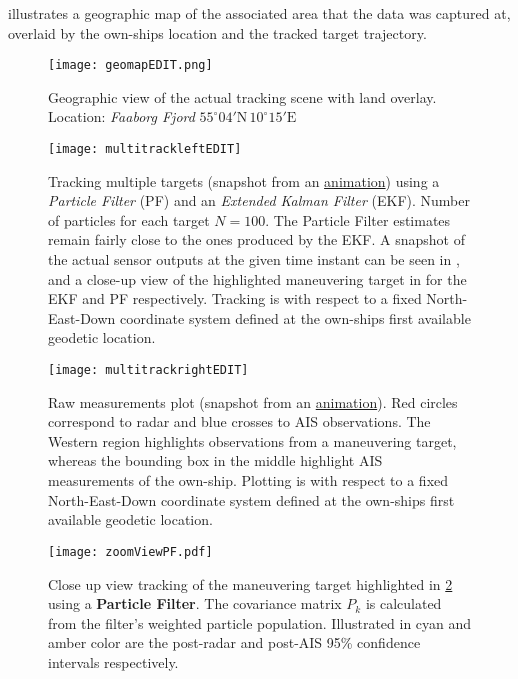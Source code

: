  illustrates a geographic map of the associated area that the data was captured at, overlaid by the own-ships location and the tracked target trajectory.


\begin{figure}[H]
	\centering
	\texttt{[image: geomapEDIT.png]}
	\caption{Geographic view of the actual tracking scene with land overlay.\\Location: \emph{Faaborg Fjord} $55^\circ 04' \text{N}  \, 10^\circ15' \text{E}$}
	\label{fig:overlay}
\end{figure}


\begin{figure}
	\centering
	\texttt{[image: multitrackleftEDIT]}
	\caption{Tracking multiple targets (snapshot from an \href{https://dimidagd.github.io/thesis/3dView_real_dataEKFandPF.gif}{animation}) using a \emph{Particle Filter} (PF) and an \emph{Extended Kalman Filter} (EKF). Number of particles for each target $N=100$. The Particle Filter estimates remain fairly close to the ones produced by the EKF. A snapshot of the actual sensor outputs at the given time instant can be seen in , and a close-up view of the highlighted maneuvering target in  for the EKF and PF respectively. Tracking is with respect to a fixed North-East-Down coordinate system defined at the own-ships first available geodetic location.}
	\label{fig:EKFandPF}
\end{figure}

\begin{figure}
	\centering
	\texttt{[image: multitrackrightEDIT]}
	\caption{Raw measurements plot (snapshot from an \href{https://dimidagd.github.io/thesis/tracking_to_referenceEKFandPF.gif}{animation}). Red circles correspond to radar and blue crosses to AIS observations. The Western region highlights observations from a maneuvering target, whereas the bounding box in the middle highlight AIS measurements of the own-ship.  Plotting is with respect to a fixed North-East-Down coordinate system defined at the own-ships first available geodetic location.}
	\label{fig:EKFandPFraw}
\end{figure}


\begin{figure}
	\centering
	\texttt{[image: zoomViewPF.pdf]}
	\caption{Close up view tracking of the maneuvering target highlighted in \cref{fig:EKFandPF} using a \textbf{Particle Filter}. The covariance matrix $P_k$ is calculated from the filter's weighted particle population. Illustrated in cyan and amber color are the post-radar and post-AIS 95\% confidence intervals respectively. }
	\label{fig:zoomviewpf}
\end{figure}


